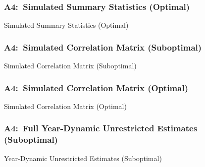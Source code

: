 \documentclass[12pt, aspectratio=169]{beamer}
\begin{document}
\begin{frame}[label=ssso]
\frametitle{A4:\ Simulated Summary Statistics (Optimal)}
\addtocounter{framenumber}{-1}
\begin{table}[htbp]
  \centering
  \addtocounter{table}{-1}
  \renewcommand{\thetable}{\arabic{table}b}
  \caption{Simulated Summary Statistics (Optimal)}
  \vspace{5pt}
  \begin{adjustbox}{totalheight=.7\textheight}

  \end{adjustbox}
\end{table}%
\hyperlink{ydueo}{}
\end{frame}

\begin{frame}[label=scms]
\frametitle{A4:\ Simulated Correlation Matrix (Suboptimal)}
\begin{table}[htbp]
  \centering
  \renewcommand{\thetable}{\arabic{table}a}
  \caption{Simulated Correlation Matrix (Suboptimal)}
  \vspace{-5pt}
  \begin{adjustbox}{width=1\textwidth}

  \end{adjustbox}
\end{table}%
\hyperlink{ydues}{}
\end{frame}

\begin{frame}[label=scmo]
\frametitle{A4:\ Simulated Correlation Matrix (Optimal)}
\addtocounter{framenumber}{-1}
\begin{table}[htbp]
  \centering
  \addtocounter{table}{-1}
  \renewcommand{\thetable}{\arabic{table}b}
  \caption{Simulated Correlation Matrix (Optimal)}
  \vspace{-5pt}
  \begin{adjustbox}{width=1\textwidth}

  \end{adjustbox}
\end{table}%
\hyperlink{ydueo}{}
\end{frame}

\begin{frame}[label=fydues]
\frametitle{A4:\ Full Year-Dynamic Unrestricted Estimates (Suboptimal)}
\begin{table}[htbp]
  \centering
  \renewcommand{\thetable}{\arabic{table}a}
  \caption{Year-Dynamic Unrestricted Estimates (Suboptimal)}
  \vspace{5pt}
  \begin{adjustbox}{totalheight=.7\textheight}

  \end{adjustbox}
\end{table}%
\hyperlink{ydues}{}
\end{frame}
\end{document}
